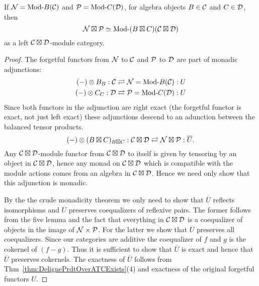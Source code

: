 \documentclass{amsart}
\begin{document}
\begin{proposition}
	If $\cN = \Mod{}{B}(\cC)$ and $\cP = \Mod{}{C}(\cD)$, for algebra objects $B \in \mathcal C$ and $C \in \mathcal D$, then $$\cN \boxtimes \cP \simeq \Mod{}{(B \boxtimes C)}(\cC \boxtimes \cD)$$ as a left $\mathcal C \boxtimes \mathcal D$-module category.
\end{proposition}

\begin{proof}
	The forgetful functors from $\mathcal N$ to $\mathcal C$ and $\mathcal P$ to $\mathcal D$ are part of monadic adjunctions:
	\begin{align*}
		(-) \otimes B_{B}:\cC \rightleftarrows \cN = \Mod{}{B}(\cC): U \\
		(-) \otimes C_{C}:\cD \rightleftarrows \cP = \Mod{}{C}(\cD): U
	\end{align*}
	Since both functors in the adjunction are right exact (the forgetful functor is exact, not just left exact) these adjunctions descend to an adunction between the balanced tensor products. 
	\begin{equation*}
		(-) \otimes (B \boxtimes C)_{B \boxtimes C}: \mathcal C \boxtimes \mathcal D \rightleftarrows \mathcal N \boxtimes \mathcal P: \overline{U}.
	\end{equation*}
	Any $\mathcal C \boxtimes \mathcal D$-module functor from $\mathcal C \boxtimes \mathcal D$ to itself is given by tensoring by an object in $\mathcal C \boxtimes \mathcal D$, hence any monad on $\mathcal C \boxtimes \mathcal D$ which is compatible with the module actions comes from an algebra in $\mathcal C \boxtimes \mathcal D$.  Hence we need only show that this adjunction is monadic.  
	
	
	By the the crude monadicity theorem \cite[\S~3.5]{MR771116} we only need to show that $\overline{U}$ reflects isomorphisms and $\overline{U}$ preserves coequalizers of reflexive pairs.  The former follows from the five lemma and the fact that everything in $\mathcal C \boxtimes \mathcal D $ is a coequalizer of objects in the image of $\mathcal N \times \mathcal P$.  For the latter we show that $\overline{U}$ preserves all coequalizers. Since our categories are additive the coequalizer of $f$ and $g$ is the cokernel of $(f-g)$.  Thus it is sufficient to show that $\overline{U}$ is exact and hence that $\overline{U}$ preserves cokernels.  The exactness of $\overline{U}$ follows from Thm~\ref{thm:DelignePrdtOverATCExists}(4) and exactness of the original forgetful functors $U$.  
\end{proof}





\end{document}
